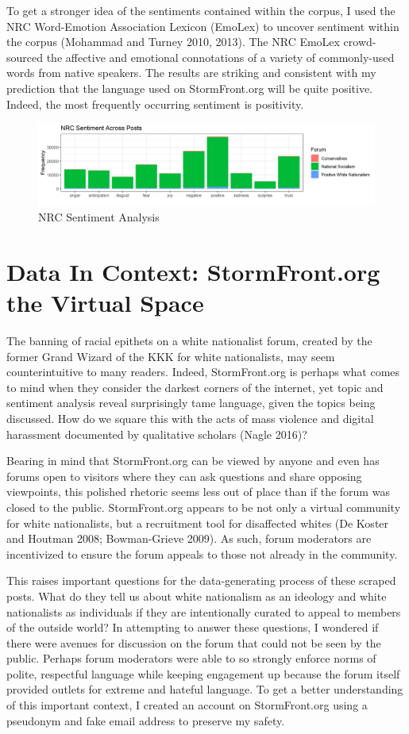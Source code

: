 \documentclass[12pt]{paper}
\begin{document}
To get a stronger idea of the sentiments contained within the corpus, I used the NRC Word-Emotion Association Lexicon (EmoLex) to uncover sentiment within the corpus (Mohammad and Turney 2010, 2013). The NRC EmoLex crowd-sourced the affective and emotional connotations of a variety of commonly-used words from native speakers. The results are striking and consistent with my prediction that the language used on StormFront.org will be quite positive. Indeed, the most frequently occurring sentiment is positivity.

\begin{figure} \centering
	\includegraphics[width=.8\linewidth]{figs/sentiment_freq_all_words.png}
	\caption{NRC Sentiment Analysis}
	\label{}
\end{figure}


\section{Data In Context: StormFront.org the Virtual Space}
The banning of racial epithets on a white nationalist forum, created by the former Grand Wizard of the KKK for white nationalists, may seem counterintuitive to many readers. Indeed, StormFront.org is perhaps what comes to mind when they consider the darkest corners of the internet, yet topic and sentiment analysis reveal surprisingly tame language, given the topics being discussed. How do we square this with the acts of mass violence and digital harassment documented by qualitative scholars (Nagle 2016)? %

Bearing in mind that StormFront.org can be viewed by anyone and even has forums open to visitors where they can ask questions and share opposing viewpoints, this polished rhetoric seems less out of place than if the forum was closed to the public. StormFront.org appears to be not only a virtual community for white nationalists, but a recruitment tool for disaffected whites (De Koster and Houtman 2008; Bowman-Grieve 2009). As such, forum moderators are incentivized to ensure the forum appeals to those not already in the community. 

This raises important questions for the data-generating process of these scraped posts. What do they tell us about white nationalism as an ideology and white nationalists as individuals if they are intentionally curated to appeal to members of the outside world? In attempting to answer these questions, I wondered if there were avenues for discussion on the forum that could not be seen by the public. Perhaps forum moderators were able to so strongly enforce norms of polite, respectful language while keeping engagement up because the forum itself provided outlets for extreme and hateful language. To get a better understanding of this important context, I created an account on StormFront.org using a pseudonym and fake email address to preserve my safety.
\end{document}
